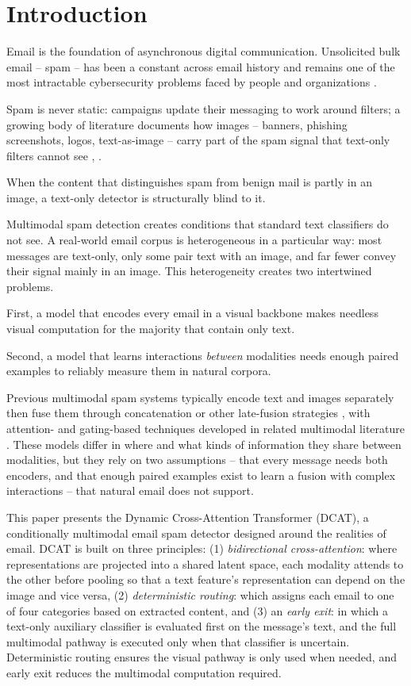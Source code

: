 \documentclass[10pt,twoside]{article}
\begin{document}
\section{Introduction}\label{sec:1}

Email is the foundation of asynchronous digital communication. Unsolicited bulk email -- spam -- has been a constant across email history and remains one of the most intractable cybersecurity problems faced by people and organizations \citep{janez2023review}.

Spam is never static: campaigns update their messaging to work around filters; a growing body of literature documents how images -- banners, phishing screenshots, logos, text-as-image -- carry part of the spam signal that text-only filters cannot see \citep{annadatha2018image}, \citep{kyaw2024phishing}.

When the content that distinguishes spam from benign mail is partly in an image, a text-only detector is structurally blind to it.

Multimodal spam detection creates conditions that standard text classifiers do not see. A real-world email corpus is heterogeneous in a particular way: most messages are text-only, only some pair text with an image, and far fewer convey their signal mainly in an image. This heterogeneity creates two intertwined problems.

First, a model that encodes every email in a visual backbone makes needless visual computation for the majority that contain only text.

Second, a model that learns interactions \emph{between} modalities needs enough paired examples to reliably measure them in natural corpora.

Previous multimodal spam systems typically encode text and images separately then fuse them through concatenation or other late-fusion strategies \citep{zhang2023mmtd}, with attention- and gating-based techniques developed in related multimodal literature \citep{lu2019vilbert}. These models differ in where and what kinds of information they share between modalities, but they rely on two assumptions -- that every message needs both encoders, and that enough paired examples exist to learn a fusion with complex interactions -- that natural email does not support.

This paper presents the Dynamic Cross-Attention Transformer (DCAT), a conditionally multimodal email spam detector designed around the realities of email. DCAT is built on three principles: (1) \emph{bidirectional cross-attention}: where representations are projected into a shared latent space, each modality attends to the other before pooling so that a text feature's representation can depend on the image and vice versa, (2) \emph{deterministic routing}: which assigns each email to one of four categories based on extracted content, and (3) an \emph{early exit}: in which a text-only auxiliary classifier is evaluated first on the message's text, and the full multimodal pathway is executed only when that classifier is uncertain. Deterministic routing ensures the visual pathway is only used when needed, and early exit reduces the multimodal computation required.
\end{document}
